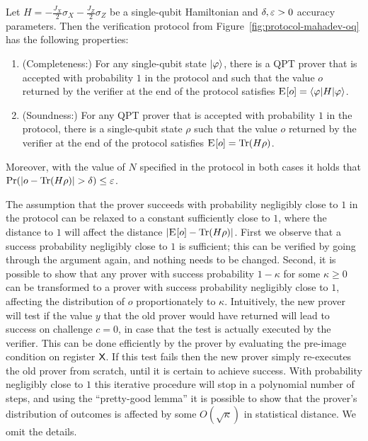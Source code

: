 \begin{proposition}\label{prop:mahadev-oq}
Let $H = -\frac{J_X}{2} \sigma_X -\frac{ J_Z}{2}\sigma_Z$ be a single-qubit Hamiltonian and $\delta,\varepsilon>0$ accuracy parameters. Then the verification protocol from Figure~\ref{fig:protocol-mahadev-oq} has the following properties:
\begin{enumerate}
\item (Completeness:) For any single-qubit state $|\varphi\rangle$, there is a QPT prover that is accepted with probability $1$ in the protocol and such that the value $o$ returned by the verifier at the end of the protocol satisfies $\textsc{E}_{}[o] = \langle\varphi| H |\varphi\rangle$.
\item (Soundness:) For any QPT prover that is accepted with probability  $1$ in the protocol, there is a single-qubit state $\rho$ such that the value $o$ returned by the verifier at the end of the protocol satisfies $\textsc{E}_{}[o] = \mbox{\rm Tr}(H\rho)$. 
\end{enumerate}
Moreover, with the value of $N$ specified in the protocol in both cases it holds that $\Pr(|o-\mbox{\rm Tr}(H\rho)| > \delta)\leq \varepsilon$.
\end{proposition}

\begin{remark}
The assumption that the prover succeeds with probability negligibly close to $1$ in the protocol can be relaxed to a constant sufficiently close to $1$, where the distance to $1$ will affect the distance $|\textsc{E}_{}[{o}] - \mbox{\rm Tr}(H\rho)|$. First we observe that a success probability negligibly close to $1$ is sufficient; this can be verified by going through the argument again, and nothing needs to be changed. Second, it is possible to show that any prover with success probability $1-\kappa$ for some $\kappa \geq 0$ can be transformed to a prover with success probability negligibly close to $1$, affecting the distribution of $o$ proportionately to $\kappa$. Intuitively, the new prover will test if the value $y$ that the old prover would have returned will lead to success on challenge $c=0$, in case that the test is actually executed by the verifier. This can be done efficiently by the prover by evaluating the pre-image condition on register ${\textsf{X}}$. If this test fails then the new prover simply re-executes the old prover from scratch, until it is certain to achieve success. With probability negligibly close to $1$ this iterative procedure will stop in a polynomial number of steps, and using the ``pretty-good lemma'' it is possible to show that the prover's distribution of outcomes is affected by some $O(\sqrt{\kappa})$ in statistical distance. We omit the details. 
\end{remark}

